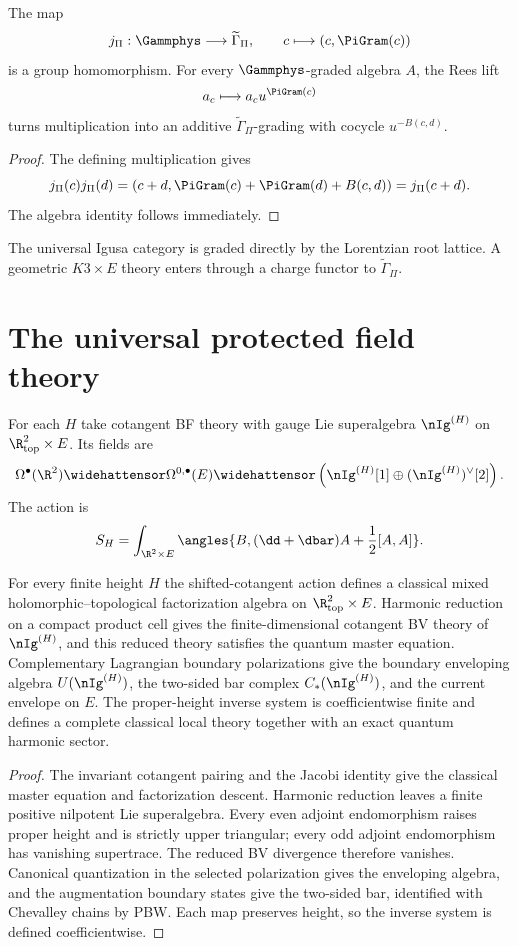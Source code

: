 \begin{theorem}
The map
\[
 j_\Pi:\Gammphys\longrightarrow\widetilde\Gamma_\Pi,
 \qquad
 c\longmapsto(c,\PiGram(c))
\]
is a group homomorphism.  For every $\Gammphys$-graded algebra $A$, the Rees lift
\[
 a_c\longmapsto a_cu^{\PiGram(c)}
\]
turns multiplication into an additive $\widetilde\Gamma_\Pi$-grading with cocycle $u^{-B(c,d)}$.
\end{theorem}
\begin{proof}
The defining multiplication gives
\[
 j_\Pi(c)j_\Pi(d)
 =(c+d,\PiGram(c)+\PiGram(d)+B(c,d))
 =j_\Pi(c+d).
\]
The algebra identity follows immediately.
\end{proof}

The universal Igusa category is graded directly by the Lorentzian root lattice.  A geometric $K3\times E$ theory enters through a charge functor to $\widetilde\Gamma_\Pi$.

\chapter{The universal protected field theory}
For each $H$ take cotangent BF theory with gauge Lie superalgebra $\nIg^{(H)}$ on $\R^2_{\mathrm{top}}\times E$.  Its fields are
\[
 \Omega^\bullet(\R^2)\widehattensor
 \Omega^{0,\bullet}(E)
 \widehattensor
 \left(\nIg^{(H)}[1]\oplus(\nIg^{(H)})^\vee[2]\right).
\]
The action is
\[
 S_H=\int_{\R^2\times E}
 \angles{B,(\dd+\dbar)A+\frac12[A,A]}.
\]

\begin{theorem}
For every finite height $H$ the shifted-cotangent action defines a classical mixed holomorphic--topological factorization algebra on $\R^2_{\mathrm{top}}\times E$.  Harmonic reduction on a compact product cell gives the finite-dimensional cotangent BV theory of $\nIg^{(H)}$, and this reduced theory satisfies the quantum master equation.  Complementary Lagrangian boundary polarizations give the boundary enveloping algebra $U(\nIg^{(H)})$, the two-sided bar complex $C_*(\nIg^{(H)})$, and the current envelope on $E$.  The proper-height inverse system is coefficientwise finite and defines a complete classical local theory together with an exact quantum harmonic sector.
\end{theorem}
\begin{proof}
The invariant cotangent pairing and the Jacobi identity give the classical master equation and factorization descent.  Harmonic reduction leaves a finite positive nilpotent Lie superalgebra.  Every even adjoint endomorphism raises proper height and is strictly upper triangular; every odd adjoint endomorphism has vanishing supertrace.  The reduced BV divergence therefore vanishes.  Canonical quantization in the selected polarization gives the enveloping algebra, and the augmentation boundary states give the two-sided bar, identified with Chevalley chains by PBW.  Each map preserves height, so the inverse system is defined coefficientwise.
\end{proof}



